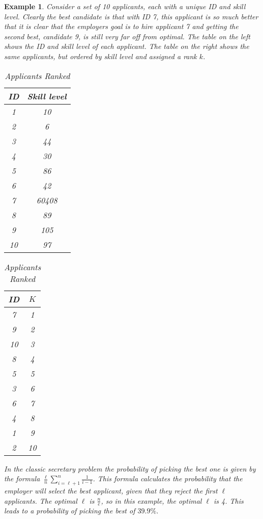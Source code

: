 \documentclass{article}
\newtheorem{example}{Example} %
\begin{document}
\begin{example}
Consider a set of 10 applicants, each with a unique ID and skill level. Clearly the best candidate is that with ID 7, this applicant is so much better that it is clear that the employers goal is to hire applicant 7 and getting the second best, candidate 9, is still very far off from optimal. The table on the left shows the ID and skill level of each applicant. The table on the right shows the same applicants, but ordered by skill level and assigned a rank $k$.

\begin{table}[H]
\begin{minipage}{0.45\textwidth}
\centering
\label{tab:applicants}
\begin{tabular}{|c|c|}
\hline
\textbf{ID} & \textbf{Skill level} \\ \hline
1 & 10 \\ \hline
2 & 6\\ \hline
3 & 44 \\ \hline
4 & 30 \\ \hline
5 & 86 \\ \hline
6 & 42 \\ \hline
7 & 60408 \\ \hline
8 & 89 \\ \hline
9 & 105 \\ \hline
10 & 97 \\ \hline
\end{tabular}
\caption{Applicants}
\end{minipage}\hfill
\begin{minipage}{0.45\textwidth}
\centering
\label{tab:applicants_ranked}
\begin{tabular}{|c|c|}
\hline
\textbf{ID} & \textbf{$K$} \\ \hline
7 & 1 \\ \hline
9 & 2\\ \hline
10 & 3 \\ \hline
8 & 4 \\ \hline
5 & 5 \\ \hline
3 & 6 \\ \hline
6 & 7 \\ \hline
4 & 8 \\ \hline
1 & 9 \\ \hline
2 & 10 \\ \hline
\end{tabular}
\caption{Applicants Ranked}
\end{minipage}
\end{table}

In the classic secretary problem the probability of picking the best one is given by the formula $\frac{\ell}{n}\sum_{i = \ell + 1}^{n}\frac{1}{i-1}$. This formula calculates the probability that the employer will select the best applicant, given that they reject the first $\ell$ applicants. The optimal $\ell$ is $\frac{n}{e}$, so in this example, the optimal $\ell$ is 4. This leads to a probability of picking the best of $39.9 \% $.
\end{example}
\end{document}
